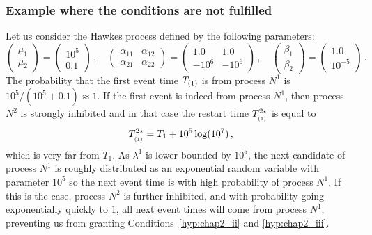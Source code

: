 \subsubsection{Example where the conditions are not fulfilled}
	\begin{example}\label{ex:chap2_2dim_counterexample}
    Let us consider the Hawkes process defined by the following parameters:
		\[
            	     \begin{pmatrix}
                      \mu_{1} \\
                      \mu_{2} 
                      \end{pmatrix} =
                      \begin{pmatrix}
                      10^5 \\ 
                      0.1
                      \end{pmatrix}\,,
                      \quad
                      \begin{pmatrix}
                      \alpha_{11} & \alpha_{12}\\
                      \alpha_{21} & \alpha_{22}
                      \end{pmatrix}=
                      \begin{pmatrix}
                      1.0 & 1.0\\
                      -10^6 & -10^6
                      \end{pmatrix}\,,
                      \quad
                      \begin{pmatrix}
                      \beta_{1} \\
                      \beta_{2} 
                      \end{pmatrix} =
                      \begin{pmatrix}
                      1.0\\ 
                      10^{-5}
                      \end{pmatrix}\,.
    		\]
            The probability that the first event time $T\park[1]$ is from process $N^1$ is $10^5 / (10^5 + 0.1) \approx 1$. If the first event is indeed from process $N^1$, then process $N^2$ is strongly inhibited and in that case the restart time $T_{\park[1]}^{2\star}$ is equal to \[T_{\park[1]}^{2\star} = T_1 + 10^5 \log(10^7)\,,\]
            which is very far from \(T_1\).
            As $\lambda^1$ is lower-bounded by $10^5$, the next candidate of process $N^1$ is roughly distributed as an exponential random variable with parameter $10^5$ so the next event time is with high probability of process $N^1$.
            If this is the case, process $N^2$ is further inhibited,
            and with probability going exponentially quickly to \(1\), all next event times will come from process \(N^1\),
            preventing us from granting Conditions~\ref{hyp:chap2_ii} and \ref{hyp:chap2_iii}.

	\end{example}

